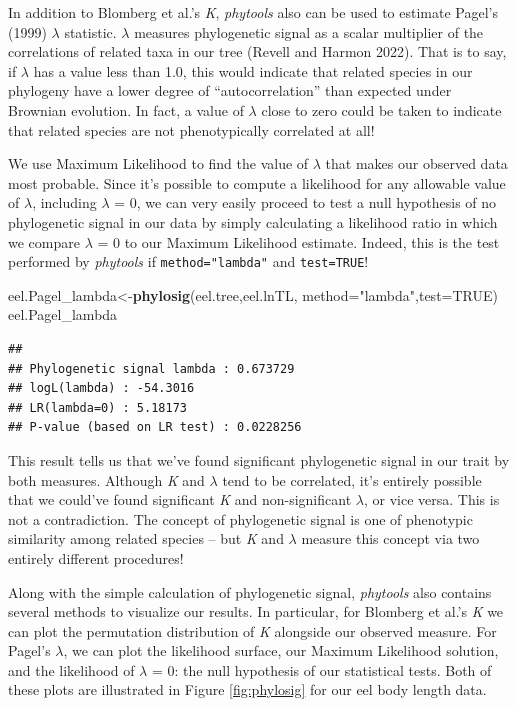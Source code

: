 \documentclass[fleqn,10pt,lineno]{wlpeerj} %
\newenvironment{Shaded}{\begin{snugshade}}{\end{snugshade}}
\newcommand{\AttributeTok}[1]{\textcolor[rgb]{0.13,0.29,0.53}{#1}}
\newcommand{\ConstantTok}[1]{\textcolor[rgb]{0.56,0.35,0.01}{#1}}
\newcommand{\FunctionTok}[1]{\textcolor[rgb]{0.13,0.29,0.53}{\textbf{#1}}}
\newcommand{\NormalTok}[1]{#1}
\newcommand{\OtherTok}[1]{\textcolor[rgb]{0.56,0.35,0.01}{#1}}
\newcommand{\StringTok}[1]{\textcolor[rgb]{0.31,0.60,0.02}{#1}}
\begin{document}
In addition to Blomberg et al.'s \emph{K}, \emph{phytools} also can be used to estimate Pagel's (1999) \(\lambda\) statistic. \(\lambda\) measures phylogenetic signal as a scalar multiplier of the correlations of related taxa in our tree (Revell and Harmon 2022). That is to say, if \(\lambda\) has a value less than 1.0, this would indicate that related species in our phylogeny have a lower degree of ``autocorrelation'' than expected under Brownian evolution. In fact, a value of \(\lambda\) close to zero could be taken to indicate that related species are not phenotypically correlated at all!

We use Maximum Likelihood to find the value of \(\lambda\) that makes our observed data most probable. Since it's possible to compute a likelihood for any allowable value of \(\lambda\), including \(\lambda\) = 0, we can very easily proceed to test a null hypothesis of no phylogenetic signal in our data by simply calculating a likelihood ratio in which we compare \(\lambda\) = 0 to our Maximum Likelihood estimate. Indeed, this is the test performed by \emph{phytools} if \texttt{method="lambda"} and \texttt{test=TRUE}!

\begin{Shaded}
\begin{Highlighting}[]
\NormalTok{eel.Pagel\_lambda}\OtherTok{\textless{}{-}}\FunctionTok{phylosig}\NormalTok{(eel.tree,eel.lnTL,}
  \AttributeTok{method=}\StringTok{"lambda"}\NormalTok{,}\AttributeTok{test=}\ConstantTok{TRUE}\NormalTok{)}
\NormalTok{eel.Pagel\_lambda}
\end{Highlighting}
\end{Shaded}

\begin{verbatim}
## 
## Phylogenetic signal lambda : 0.673729 
## logL(lambda) : -54.3016 
## LR(lambda=0) : 5.18173 
## P-value (based on LR test) : 0.0228256
\end{verbatim}

This result tells us that we've found significant phylogenetic signal in our trait by both measures. Although \emph{K} and \(\lambda\) tend to be correlated, it's entirely possible that we could've found significant \emph{K} and non-significant \(\lambda\), or vice versa. This is not a contradiction. The concept of phylogenetic signal is one of phenotypic similarity among related species -- but \emph{K} and \(\lambda\) measure this concept via two entirely different procedures!

Along with the simple calculation of phylogenetic signal, \emph{phytools} also contains several methods to visualize our results. In particular, for Blomberg et al.'s \emph{K} we can plot the permutation distribution of \emph{K} alongside our observed measure. For Pagel's \(\lambda\), we can plot the likelihood surface, our Maximum Likelihood solution, and the likelihood of \(\lambda\) = 0: the null hypothesis of our statistical tests. Both of these plots are illustrated in Figure \ref{fig:phylosig} for our eel body length data.
\end{document}
